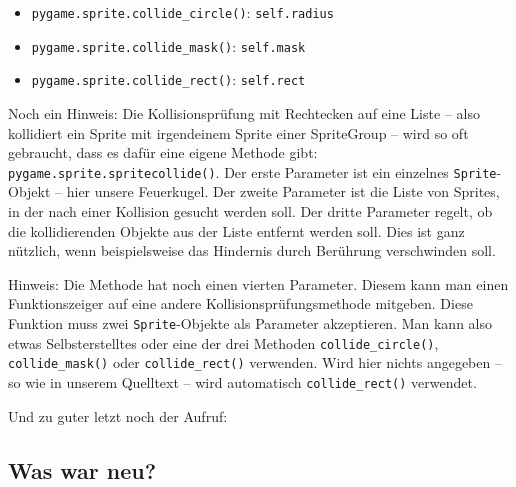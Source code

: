 \begin{itemize}
    \item \texttt{pygame.sprite.collide\_circle()}: \texttt{self.radius}
    \item \texttt{pygame.sprite.collide\_mask()}: \texttt{self.mask}
    \item \texttt{pygame.sprite.collide\_rect()}: \texttt{self.rect}
\end{itemize}


Noch ein Hinweis: Die Kollisionsprüfung mit Rechtecken auf eine Liste -- also kollidiert ein Sprite mit irgendeinem Sprite einer SpriteGroup -- wird so oft gebraucht, dass es dafür eine eigene Methode gibt: \texttt{pygame.sprite.spritecollide()}. Der erste Parameter ist ein einzelnes \texttt{Sprite}-Objekt -- hier unsere Feuerkugel. Der zweite Parameter ist die Liste von Sprites, in der nach einer Kollision gesucht werden soll. Der dritte Parameter regelt, ob die kollidierenden Objekte aus der Liste entfernt werden soll. Dies ist ganz nützlich, wenn beispielsweise das Hindernis durch Berührung verschwinden soll. 

Hinweis: Die Methode hat noch einen vierten Parameter. Diesem kann man einen Funktionszeiger auf eine andere Kollisionsprüfungsmethode mitgeben. Diese Funktion muss zwei \texttt{Sprite}-Objekte als Parameter akzeptieren. Man kann also etwas Selbsterstelltes oder eine der drei Methoden \texttt{collide\_circle()}, \texttt{collide\_mask()} oder \texttt{collide\_rect()} verwenden. Wird hier nichts angegeben -- so wie in unserem Quelltext -- wird automatisch \texttt{collide\_rect()} verwendet.


Und zu guter letzt noch der Aufruf:



\subsection*{Was war neu?}


